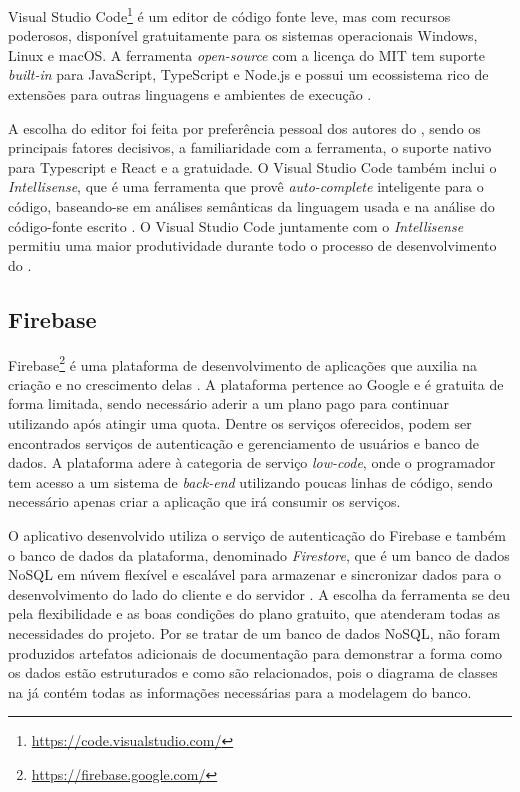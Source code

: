 Visual Studio Code\footnote{\url{https://code.visualstudio.com/}} é um editor de código fonte leve, mas com recursos poderosos, disponível gratuitamente para os sistemas operacionais Windows, Linux e macOS. A ferramenta \textit{open-source} com a licença do MIT tem suporte \textit{built-in} para JavaScript, TypeScript e Node.js e possui um ecossistema rico de extensões para outras linguagens e ambientes de execução \cite{vscode}.

A escolha do editor foi feita por preferência pessoal dos autores do \appName, sendo os principais fatores decisivos, a familiaridade com a ferramenta, o suporte nativo para Typescript e React e a gratuidade. O Visual Studio Code também inclui o \textit{Intellisense}, que é uma ferramenta que provê \textit{auto-complete} inteligente para o código, baseando-se em análises semânticas da linguagem usada e na análise do código-fonte escrito \cite{intellisense}. O Visual Studio Code juntamente com o \textit{Intellisense} permitiu uma maior produtividade durante todo o processo de desenvolvimento do \appName.

\subsection{Firebase}
\label{firebase}

Firebase\footnote{\url{https://firebase.google.com/}} é uma plataforma de desenvolvimento de aplicações que auxilia na criação e no crescimento delas \cite{firebase}. A plataforma pertence ao Google e é gratuita de forma limitada, sendo necessário aderir a um plano pago para continuar utilizando após atingir uma quota. Dentre os serviços oferecidos, podem ser encontrados serviços de autenticação e gerenciamento de usuários e banco de dados. A plataforma adere à categoria de serviço \textit{low-code}, onde o programador tem acesso a um sistema de \textit{back-end} utilizando poucas linhas de código, sendo necessário apenas criar a aplicação que irá consumir os serviços.

O aplicativo desenvolvido utiliza o serviço de autenticação do Firebase e também o banco de dados da plataforma, denominado \textit{Firestore}, que é um banco de dados NoSQL em núvem flexível e escalável para armazenar e sincronizar dados para o desenvolvimento do lado do cliente e do servidor \cite{firestore}. A escolha da ferramenta se deu pela flexibilidade e as boas condições do plano gratuito, que atenderam todas as necessidades do projeto. Por se tratar de um banco de dados NoSQL, não foram produzidos artefatos adicionais de documentação para demonstrar a forma como os dados estão estruturados e como são relacionados, pois o diagrama de classes na  já contém todas as informações necessárias para a modelagem do banco.
